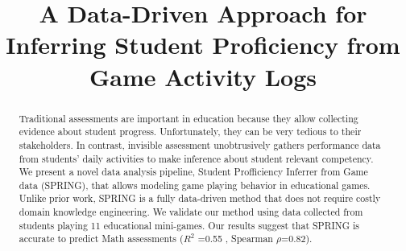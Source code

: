 \documentclass{sigchi}
\def\algname{SPRING\xspace}
\def\plaintitle{A Data-Driven Approach for Inferring Student Proficiency from Game Activity Logs  }
\begin{document}
\title{\plaintitle}

\author
{%
}

  
\maketitle

\begin{abstract}
		Traditional assessments are important in education because they allow collecting evidence about student progress. 
		Unfortunately, they can be very tedious to their stakeholders.
		In contrast, invisible assessment  unobtrusively gathers  performance data from students' daily activities to make inference about student relevant competency.
We present a novel data analysis pipeline, {Student Profficiency Inferrer from Game data} (\algname), that allows modeling  game playing behavior in educational games.
Unlike prior work, \algname is a fully data-driven method that does not require costly domain knowledge engineering.
We validate our method using data collected from students playing 11 educational mini-games.
Our results suggest that  \algname is accurate to predict Math assessments ($R^2$ =0.55 , Spearman $\rho$=0.82).
\end{abstract}

{}
\end{document}
